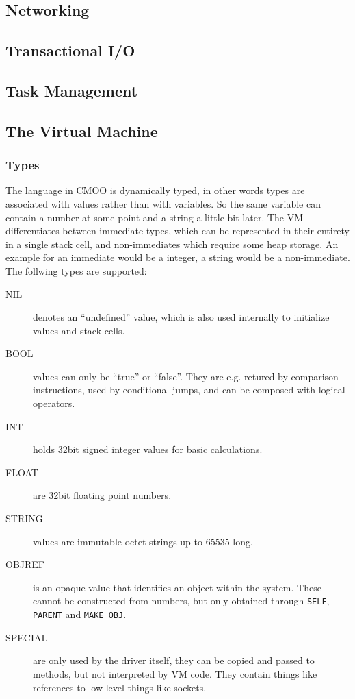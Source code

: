 \documentclass[12pt,a4paper]{article}
\begin{document}
\subsection{Networking}\label{sec:networking}

\subsection{Transactional I/O}\label{sec:transactional_io}

\subsection{Task Management}\label{sec:task_mgmt}

\subsection{The Virtual Machine}\label{sec:virtual_machine}

\subsubsection{Types}\label{sec:types}

The language in CMOO is dynamically typed, in other words types are associated with values rather than with variables. So the same variable can contain a number at some point and a string a little bit later. The VM differentiates between immediate types, which can be represented in their entirety in a single stack cell, and non-immediates which require some heap storage. An example for an immediate would be a integer, a string would be a non-immediate. The follwing types are supported:

\begin{description}
\item[NIL] denotes an ``undefined'' value, which is also used internally to initialize values and stack cells.  
\item[BOOL] values can only be ``true'' or ``false''. They are e.g. retured by comparison instructions, used by conditional jumps, and can be composed with logical operators.
\item[INT] holds 32bit signed integer values for basic calculations.
\item[FLOAT] are 32bit floating point numbers.
\item[STRING] values are immutable octet strings up to 65535 long.  
\item[OBJREF] is an opaque value that identifies an object within the system. These cannot be constructed from numbers, but only obtained through \verb|SELF|, \verb|PARENT| and \verb|MAKE_OBJ|. 
\item[SPECIAL] are only used by the driver itself, they can be copied and passed to methods, but not interpreted by VM code. They contain things like references to low-level things like sockets.
\end{description}
\end{document}
